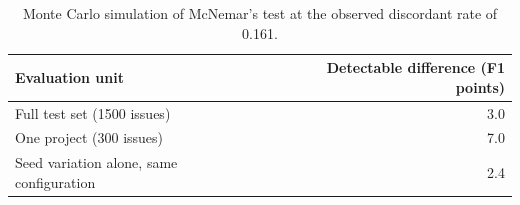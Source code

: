 \begin{table}[htbp]
\centering
\caption{Minimum detectable difference at 80\% power, $\alpha = 0.05$.}
\label{tab:power}
\begin{tabular}{lr}
\toprule
Evaluation unit & Detectable difference (F1 points) \\
\midrule
Full test set (1500 issues) & 3.0 \\
One project (300 issues) & 7.0 \\
\midrule
Seed variation alone, same configuration & 2.4 \\
\bottomrule
\end{tabular}
\caption*{\footnotesize Monte Carlo simulation of McNemar's test at the observed discordant rate of 0.161.}
\end{table}
